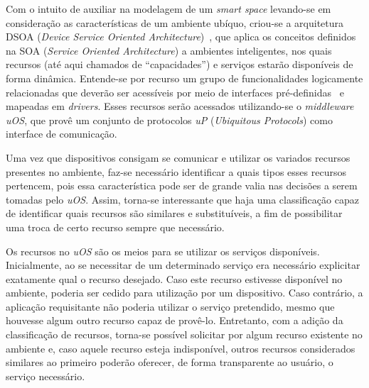 Com o intuito de auxiliar na modelagem de um \emph{smart space} levando-se em consideração as características de um ambiente ubíquo, criou-se a arquitetura DSOA (\emph{Device Service Oriented Architecture})~\cite{buzetoDSOA2010}, que aplica os conceitos definidos na SOA (\emph{Service Oriented Architecture}) a ambientes inteligentes, nos quais recursos (até aqui chamados de ``capacidades'') e serviços estarão disponíveis de forma dinâmica. Entende-se por recurso um grupo de funcionalidades logicamente relacionadas que deverão ser acessíveis por meio de interfaces pré-definidas~\cite{buzeto2010} e mapeadas em \emph{drivers}. Esses recursos serão acessados utilizando-se o \emph{middleware} \emph{uOS}, que provê um conjunto de protocolos \emph{uP} (\emph{Ubiquitous Protocols}) como interface de comunicação.

Uma vez que dispositivos consigam se comunicar e utilizar os variados recursos presentes no ambiente, faz-se necessário identificar a quais tipos esses recursos pertencem, pois essa característica pode ser de grande valia nas decisões a serem tomadas pelo \emph{uOS}. Assim, torna-se interessante que haja uma classificação capaz de identificar quais recursos são similares e substituíveis, a fim de possibilitar uma troca de certo recurso sempre que necessário.

Os recursos no \emph{uOS} são os meios para se utilizar os serviços disponíveis. Inicialmente, ao se necessitar de um determinado serviço era necessário explicitar exatamente qual o recurso desejado. Caso este recurso estivesse disponível no ambiente, poderia ser cedido para utilização por um dispositivo. Caso contrário, a aplicação requisitante não poderia utilizar o serviço pretendido, mesmo que houvesse algum outro recurso capaz de provê-lo. Entretanto, com a adição da classificação de recursos, torna-se possível solicitar por algum recurso existente no ambiente e, caso aquele recurso esteja indisponível, outros recursos considerados similares ao primeiro poderão oferecer, de forma transparente ao usuário, o serviço necessário.


